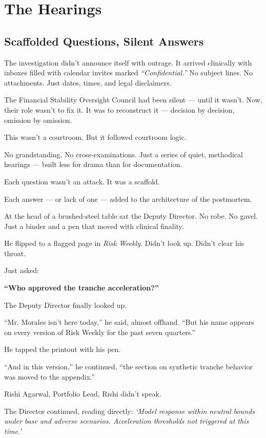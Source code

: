 \section{The Hearings}


\subsection{Scaffolded Questions, Silent Answers}

The investigation didn’t announce itself with outrage.
It arrived clinically with inboxes filled with calendar invites marked \textit{“Confidential.”}
No subject lines. No attachments. Just dates, times, and legal disclaimers.

The Financial Stability Oversight Council had been silent — until it wasn’t.
Now, their role wasn’t to fix it.
It was to reconstruct it — decision by decision, omission by omission.

This wasn’t a courtroom.
But it followed courtroom logic.

No grandstanding. No cross-examinations.
Just a series of quiet, methodical hearings — built less for drama than for documentation.

Each question wasn’t an attack.
It was a scaffold.

Each answer — or lack of one — added to the architecture of the postmortem.

At the head of a brushed-steel table sat the Deputy Director.
No robe. No gavel. Just a binder and a pen that moved with clinical finality.

He flipped to a flagged page in \textit{Risk Weekly}.
Didn’t look up.
Didn’t clear his throat.

Just asked:

\textbf{“Who approved the tranche acceleration?”}

The Deputy Director finally looked up.

“Mr. Morales isn’t here today,” he said, almost offhand. “But his name appears on every 
version of Risk Weekly for the past seven quarters.”

He tapped the printout with his pen.

“And in this version,” he continued, “the section on synthetic tranche behavior was moved 
to the appendix.”

Rishi Agarwal, Portfolio Lead, Rishi didn’t speak.

The Director continued, reading directly:
\textit{‘Model response within neutral bounds under base and adverse scenarios. Acceleration 
thresholds not triggered at this time.’}

